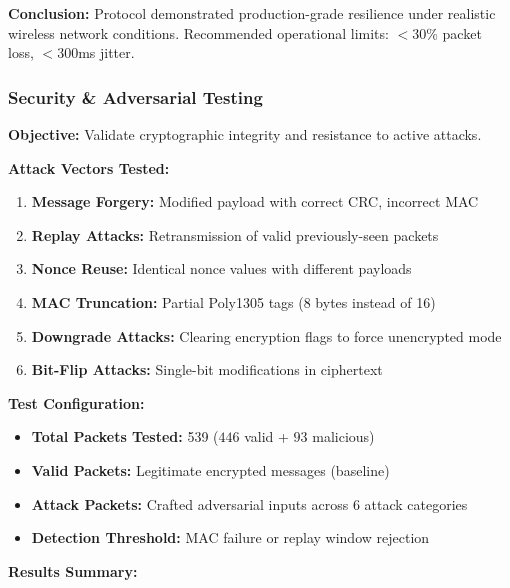 \documentclass[11pt,a4paper]{article}
\begin{document}
\textbf{Conclusion:} Protocol demonstrated production-grade resilience under realistic wireless network conditions. Recommended operational limits: $<$30\% packet loss, $<$300ms jitter.

\subsubsection{Security \& Adversarial Testing}

\textbf{Objective:} Validate cryptographic integrity and resistance to active attacks.

\textbf{Attack Vectors Tested:}
\begin{enumerate}[noitemsep]
    \item \textbf{Message Forgery:} Modified payload with correct CRC, incorrect MAC
    \item \textbf{Replay Attacks:} Retransmission of valid previously-seen packets
    \item \textbf{Nonce Reuse:} Identical nonce values with different payloads
    \item \textbf{MAC Truncation:} Partial Poly1305 tags (8 bytes instead of 16)
    \item \textbf{Downgrade Attacks:} Clearing encryption flags to force unencrypted mode
    \item \textbf{Bit-Flip Attacks:} Single-bit modifications in ciphertext
\end{enumerate}

\textbf{Test Configuration:}
\begin{itemize}[noitemsep]
    \item \textbf{Total Packets Tested:} 539 ($446$ valid + $93$ malicious)
    \item \textbf{Valid Packets:} Legitimate encrypted messages (baseline)
    \item \textbf{Attack Packets:} Crafted adversarial inputs across 6 attack categories
    \item \textbf{Detection Threshold:} MAC failure or replay window rejection
\end{itemize}

\textbf{Results Summary:}
\end{document}
